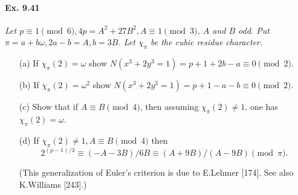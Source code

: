 \documentclass[11pt,a4paper]{article}
\begin{document}
\paragraph{Ex. 9.41}
{\it Let $p\equiv 1 \pmod 6, 4p = A^2 + 27 B^2, A \equiv 1 \pmod 3$, $A$ and $B$ odd. Put $\pi = a+b\omega, 2a-b =A, b = 3B$. Let $\chi_\pi$ be the cubic residue character.
\begin{enumerate}
\item[(a)] If $\chi_\pi(2) = \omega$ show $N(x^3+2y^3 = 1) = p+1 + 2b-a \equiv 0 \pmod 2$.
\item[(b)] If $\chi_\pi(2) = \omega^2$ show $N(x^3 + 2y^3 = 1) = p+1 -a-b \equiv 0 \pmod 2$.
\item[(c)] Show that if $A \equiv B \pmod 4$, then assuming $\chi_\pi(2) \ne 1$, one has $\chi_\pi(2) = \omega$.
\item[(d)] If $\chi_\pi(2) \ne 1, A \equiv B \pmod 4$ then $$2^{(p-1)/3} \equiv (-A-3B)/6B \equiv (A+9B)/(A-9B) \pmod \pi.$$

(This generalization of Euler's criterion is due to E.Lehmer [174]. See also K.Williams [243].)
\end{enumerate}
}
\end{document}
